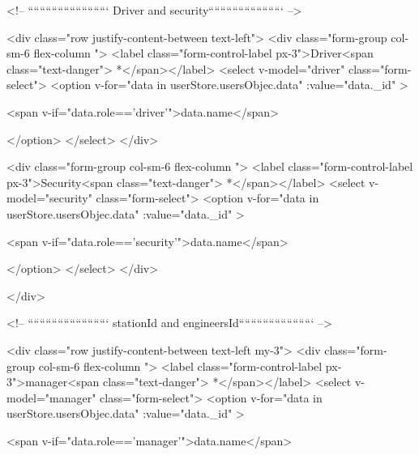                         <!-- ``````````````````````````` Driver and security````````````````````````` -->

                        <div class="row justify-content-between text-left">
                            <div class="form-group col-sm-6 flex-column "> <label
                                    class="form-control-label px-3">Driver<span class="text-danger"> *</span></label>
                                    <select v-model="driver" class="form-select">
                                    <option v-for="data in userStore.usersObjec.data" :value="data._id" >
                                       
                                        <span v-if="data.role=='driver'">{{data.name}}</span>

                                    </option>
                                </select>
                            </div>

                            <div class="form-group col-sm-6 flex-column "> <label
                                    class="form-control-label px-3">Security<span class="text-danger"> *</span></label>
                                    <select v-model="security" class="form-select">
                                        <option v-for="data in userStore.usersObjec.data" :value="data._id" >
                                       
                                            <span v-if="data.role=='security'">{{data.name}}</span>

                                    </option>
                                </select>
                            </div>

                        </div>


                        <!-- ``````````````````````````` stationId and engineersId````````````````````````` -->

                        <div class="row justify-content-between text-left my-3">
                            <div class="form-group col-sm-6 flex-column "> <label
                                    class="form-control-label px-3">manager<span class="text-danger"> *</span></label>
                                <select v-model="manager" class="form-select">
                                    <option v-for="data in userStore.usersObjec.data" :value="data._id" >
                                       
                                        <span v-if="data.role=='manager'">{{data.name}}</span>

